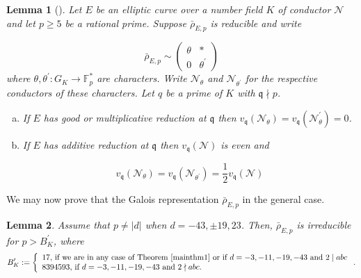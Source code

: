 \documentclass[]{article}
\newtheorem{lemma}{Lemma}
\begin{document}
\begin{lemma}[{\cite[Lemma 6.3]{freitas2015fermat}}]\label{freitsiksek-exponent}
Let $E$ be an elliptic curve over a number field $K$ of conductor $\mathcal{N}$ and let $p \geq 5$ be a rational prime. Suppose $\bar{\rho}_{E, p}$ is reducible and write

$$
\bar{\rho}_{E, p} \sim\left(\begin{array}{cc}
\theta & * \\
0 & \theta^{\prime}
\end{array}\right)
$$where $\theta, \theta^{\prime}: G_K \rightarrow \mathbb{F}_p^*$ are characters. Write $\mathcal{N}_\theta$ and $\mathcal{N}_{\theta^{\prime}}$ for the respective conductors of these characters. Let $q$ be a prime of $K$ with $\mathfrak{q} \nmid p$.

\begin{enumerate}[(a)]
\item If $E$ has good or multiplicative reduction at $\mathfrak{q}$ then $v_{\mathfrak{q}}\left(\mathcal{N}_\theta\right)=v_{\mathfrak{q}}\left(\mathcal{N}_\theta^{\prime}\right)=0$.
\item If $E$ has additive reduction at $\mathfrak{q}$ then $v_{\mathfrak{q}}(\mathcal{N})$ is even and

$$
v_{\mathfrak{q}}\left(\mathcal{N}_\theta\right)=v_{\mathfrak{q}}\left(\mathcal{N}_{\theta^{\prime}}\right)=\frac{1}{2} v_{\mathfrak{q}}(\mathcal{N})
$$
\end{enumerate}
\end{lemma}

We may now prove that the Galois representation $\bar{\rho}_{E, p}$ in the general case. 

\begin{lemma}\label{irred19}
Assume that $p\ne |d|$ when $d=-43,\pm 19, 23$. Then, $\bar{\rho}_{E, p}$ is irreducible for $p>B^{\prime}_K$, where $$B^{\prime}_K:=\left\{\begin{array}{l}
17 \text {, if we are in any case of Theorem \ref{mainthm1} or if $d=-3,-11,-19,-43$ and $2\mid abc$} \\

8394593 \text {, if  $d=-3,-11, -19,-43$ and $2\nmid abc$. }
\end{array}\right..$$    
\end{lemma} 
\end{document}
